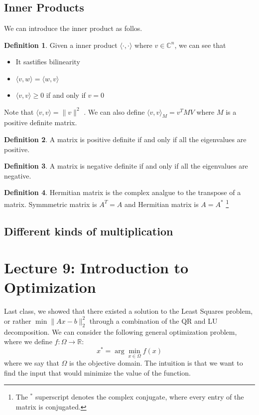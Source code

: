 \documentclass[11pt]{article}
\theoremstyle{definition}
\newtheorem{definition}{Definition}[section]
\newcommand{\R}{\mathbb{R}}
\newcommand{\C}{\mathbb{C}}
\begin{document}
\subsection{Inner Products}
We can introduce the inner product as follos. 
\begin{definition}
  Given a inner product $\langle \cdot , \cdot \rangle $ where $v \in \C^n$, we can see that 
  \begin{itemize}
    \item It sastifies bilinearity 
    \item $\langle v, w \rangle = \langle w , v \rangle$
    \item $\langle v, v \rangle \geq 0$ if and only if $v = 0$
  \end{itemize}
  Note that $\langle v, v \rangle = \| v \|^2$ . We can also define $\langle v, v \rangle_M = v^T M V$ where $M$ is a positive definite matrix.
\end{definition}
\begin{definition}
  A matrix is positive definite if and only if all the eigenvalues are positive. 
\end{definition}
\begin{definition}
  A matrix is negative definite if and only if all the eigenvalues are negative. 
\end{definition}
\begin{definition}
  Hermitian matrix is the complex analgue to the transpose of a matrix. Symmmetric matrix is $A^T = A$ and Hermitian matrix is $A = A^*$ \footnote{The ${}^*$ superscript denotes the complex conjugate, where every entry of the matrix is conjugated.}
\end{definition}
\subsection{Different kinds of multiplication}


\section{Lecture 9: Introduction to Optimization}
Last class, we showed that there existed a solution to the Least Squares problem, or rather $\min \|Ax - b\|^2_2$ through a combination of the QR and LU decomposition. We can consider the following general optimization problem, where we define $f: \Omega \to \R$:
\[
x^* = \arg \min_{x \in \Omega} f(x)
\]
where we say that $\Omega$ is the objective domain. The intuition is that we want to find the input that would minimize the value of the function. 
\end{document}
